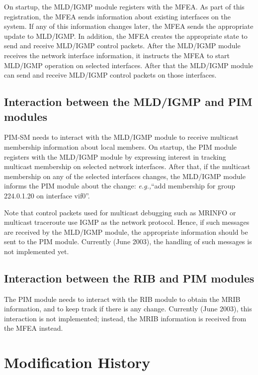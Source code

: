 \documentclass[11pt]{article}
\newcommand{\eg}{\emph{e.g.,}\xspace}
\begin{document}
On startup, the MLD/IGMP module registers with the MFEA. As part of this
registration, the MFEA sends information about existing
interfaces on the system. If
any of this information changes later, the MFEA sends the appropriate update
to MLD/IGMP. In addition, the MFEA creates the appropriate state to send and
receive MLD/IGMP control packets. After the MLD/IGMP module receives the
network interface information, it instructs the MFEA to start MLD/IGMP
operation on selected interfaces. After that the MLD/IGMP module can send and
receive MLD/IGMP control packets on those interfaces.

\subsection{Interaction between the MLD/IGMP and PIM modules}

PIM-SM needs to interact with the MLD/IGMP module to receive multicast
membership information about local members. On startup, the PIM module
registers with the MLD/IGMP module by expressing interest in tracking
multicast membership on selected network interfaces. After that, if
the multicast membership on any of the selected interfaces changes, the
MLD/IGMP module informs the PIM module about the change: \eg ``add
membership for group 224.0.1.20 on interface vif0''.

Note that control packets used for multicast debugging such as MRINFO or
multicast traceroute use IGMP as the network protocol. Hence, if such
messages are received by the MLD/IGMP module, the appropriate
information should be sent to the PIM module. Currently (June 2003),
the handling of such messages is not implemented yet.

\subsection{Interaction between the RIB and PIM modules}

The PIM module needs to interact with the RIB module to obtain the MRIB
information, and to keep track if there is any change.
Currently (June 2003), this interaction is not implemented;
instead, the MRIB information is received from the MFEA instead.


\appendix
\section{Modification History}
\end{document}
